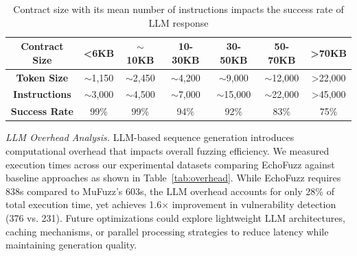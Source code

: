 \documentclass[sigconf]{acmart}
\newcommand{\ToolName}{\textcolor{ToolNameColor}{\textsf{{EchoFuzz}}}}
\begin{document}
\begin{sloppypar}
\begin{table}[b]
\vspace{-11pt}
\centering
\caption{\small Contract size with its mean number of instructions impacts the success rate of LLM response}
\label{tab:token_size}
\vspace{-10pt}
{\fontsize{7.8}{10.5}\selectfont
\setlength{\tabcolsep}{3pt}%
\renewcommand{\arraystretch}{1}%
\begin{tabular}{|c|c|c|c|c|c|c|}
\hline
\textbf{Contract Size} & \textless{}6KB & $\sim$10KB  & 10-30KB     & 30-50KB      & 50-70KB      & \textgreater{}70KB   \\ \hline
\textbf{Token Size}    & $\sim$1,150    & $\sim$2,450 & $\sim$4,200 & $\sim$9,000  & $\sim$12,000 & \textgreater{}22,000 \\ \hline
\textbf{Instructions}  & $\sim$3,000    & $\sim$4,500 & $\sim$7,000 & $\sim$15,000 & $\sim$22,000 & \textgreater{}45,000 \\ \hline
\textbf{Success Rate}  & 99\%           & 99\%        & 94\%        & 92\%         & 83\%         & 75\%                 \\ \hline
\end{tabular}%
}
\vspace{-3pt}
\end{table}




%
\textit{LLM Overhead Analysis.} \quad
LLM-based sequence generation introduces computational overhead that impacts overall fuzzing efficiency. We measured execution times across our experimental datasets comparing \ToolName{} against baseline approaches as shown in Table~\ref{tab:overhead}. While \ToolName{} requires 838s compared to MuFuzz's 603s, the LLM overhead accounts for only 28\% of total execution time, yet achieves 1.6$\times$ improvement in vulnerability detection (376 vs. 231). Future optimizations could explore lightweight LLM architectures, caching mechanisms, or parallel processing strategies to reduce latency while maintaining generation quality.



\end{sloppypar}
\end{document}
